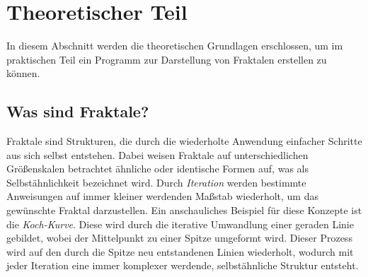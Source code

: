 \pagestyle{fancy}
\renewcommand{\chaptermark}[1]{\markboth{#1}{#1}}
\renewcommand{\headrulewidth}{0.4pt}

\fancyhead[R]{\leftmark}
\chapter{Theoretischer Teil}
\thispagestyle{fancy} %

In diesem Abschnitt werden die theoretischen Grundlagen erschlossen, um im
praktischen Teil ein Programm zur Darstellung von Fraktalen erstellen zu
können.

\section{Was sind Fraktale?}
Fraktale sind Strukturen, die durch die wiederholte Anwendung einfacher
Schritte aus sich selbst entstehen. Dabei weisen Fraktale auf unterschiedlichen
Größenskalen betrachtet ähnliche oder identische Formen auf, was als
Selbstähnlichkeit bezeichnet wird. Durch \textit{Iteration} werden bestimmte
Anweisungen auf immer kleiner werdenden Maßstab wiederholt, um das gewünschte
Fraktal darzustellen. \hfill \break \newline Ein anschauliches Beispiel für
diese Konzepte ist die \textit{Koch-Kurve}. Diese wird durch die iterative
Umwandlung einer geraden Linie gebildet, wobei der Mittelpunkt zu einer Spitze
umgeformt wird. Dieser Prozess wird auf den durch die Spitze neu entstandenen
Linien wiederholt, wodurch mit jeder Iteration eine immer komplexer werdende,
selbstähnliche Struktur entsteht. \newline
